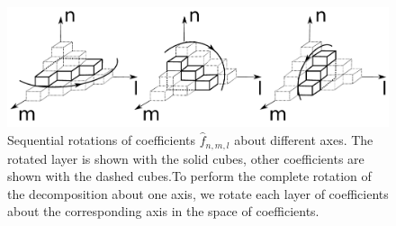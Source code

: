 \begin{figure}[ht!]
\label{pic: rotationInterpretation}
\includegraphics[width=1\textwidth]{Hermite/Fig/figure4.pdf}
\caption[Rotations of the Hermite expansion]{Sequential rotations of coefficients $\hat{f}_{n,m,l}$ about different
axes. The rotated layer  is shown with the solid cubes, other coefficients
are shown with the dashed cubes.To perform the complete 
rotation of the decomposition about one axis, we rotate each layer
of coefficients about the corresponding axis in the space of coefficients.}
\end{figure}


%

